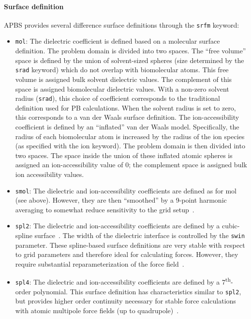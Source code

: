\documentclass[12pt,titlepage]{article}
\newcommand{\keyword}[1]{\texttt{#1}}
\begin{document}
\paragraph{Surface definition}
APBS provides several difference surface definitions through the \keyword{srfm} keyword:
\begin{itemize}
	\item \keyword{mol}: The dielectric coefficient is defined based on a molecular surface definition.
	The problem domain is divided into two spaces.
	The ``free volume'' space is defined by the union of solvent-sized spheres (size determined by the \keyword{srad} keyword) which do not overlap with biomolecular atoms.
	This free volume is assigned bulk solvent dielectric values.
	The complement of this space is assigned biomolecular dielectric values.
	With a non-zero solvent radius (\keyword{srad}), this choice of coefficient corresponds to the traditional definition used for PB calculations.
	When the solvent radius is set to zero, this corresponds to a van der Waals surface definition.
	The ion-accessibility coefficient is defined by an ``inflated'' van der Waals model.
	Specifically, the radius of each biomolecular atom is increased by the radius of the ion species (as specified with the ion keyword).
	The problem domain is then divided into two spaces.
	The space inside the union of these inflated atomic spheres is assigned an ion-accessibility value of 0; the complement space is assigned bulk ion accessibility values.
	\item \keyword{smol}: The dielectric and ion-accessibility coefficients are defined as for mol (see above).
	However, they are then ``smoothed'' by a 9-point harmonic averaging to somewhat reduce sensitivity to the grid setup~\cite{Bruccoleri1997}.
	\item \keyword{spl2}: The dielectric and ion-accessibility coefficients are defined by a cubic-spline surface~\cite{IBR98}.
	The width of the dielectric interface is controlled by the \keyword{swin} parameter.
	These spline-based surface definitions are very stable with respect to grid parameters and therefore ideal for calculating forces. However, they require substantial reparameterization of the force field~\cite{Nina1999}.
	\item \keyword{spl4}: The dielectric and ion-accessibility coefficients are defined by a 7\textsuperscript{th}-order polynomial.
	This surface definition has characteristics similar to \keyword{spl2}, but provides higher order continuity necessary for stable force calculations with atomic multipole force fields (up to quadrupole)~\cite{Schnieders2007}.
\end{itemize}
\end{document}
